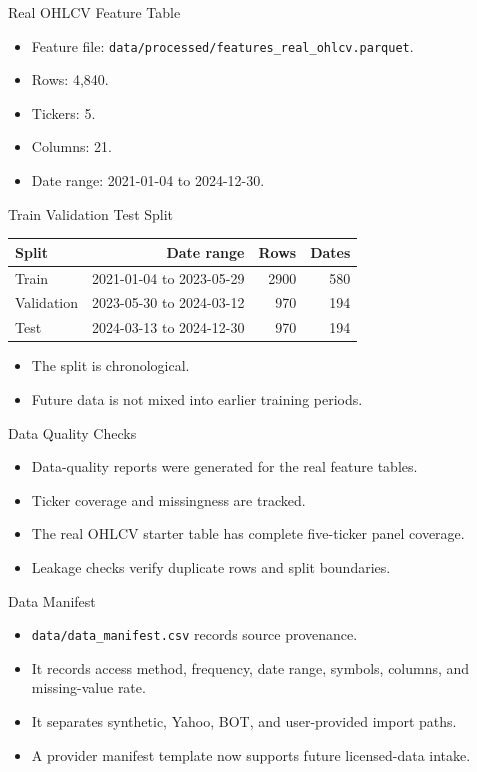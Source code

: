 \documentclass[aspectratio=43,10pt]{beamer}
\begin{document}
\begin{frame}{Real OHLCV Feature Table}
\begin{itemize}
  \item Feature file: \texttt{data/processed/features\_real\_ohlcv.parquet}.
  \item Rows: 4,840.
  \item Tickers: 5.
  \item Columns: 21.
  \item Date range: 2021-01-04 to 2024-12-30.
\end{itemize}
\end{frame}

\begin{frame}{Train Validation Test Split}
\begin{center}
\begin{tabular}{lrrr}
\toprule
Split & Date range & Rows & Dates \\
\midrule
Train & 2021-01-04 to 2023-05-29 & 2900 & 580 \\
Validation & 2023-05-30 to 2024-03-12 & 970 & 194 \\
Test & 2024-03-13 to 2024-12-30 & 970 & 194 \\
\bottomrule
\end{tabular}
\end{center}
\begin{itemize}
  \item The split is chronological.
  \item Future data is not mixed into earlier training periods.
\end{itemize}
\end{frame}

\begin{frame}{Data Quality Checks}
\begin{itemize}
  \item Data-quality reports were generated for the real feature tables.
  \item Ticker coverage and missingness are tracked.
  \item The real OHLCV starter table has complete five-ticker panel coverage.
  \item Leakage checks verify duplicate rows and split boundaries.
\end{itemize}
\end{frame}

\begin{frame}{Data Manifest}
\begin{itemize}
  \item \texttt{data/data\_manifest.csv} records source provenance.
  \item It records access method, frequency, date range, symbols, columns, and missing-value rate.
  \item It separates synthetic, Yahoo, BOT, and user-provided import paths.
  \item A provider manifest template now supports future licensed-data intake.
\end{itemize}
\end{frame}
\end{document}
